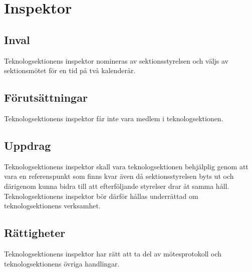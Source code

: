 \section{Inspektor}

\subsection{Inval}
Teknologsektionens inspektor nomineras av sektionsstyrelsen och väljs av sektionsmötet för en tid på två kalenderår.

\subsection{Förutsättningar}
Teknologsektionens inspektor får inte vara medlem i teknologsektionen.

\subsection{Uppdrag}
Teknologsektionens inspektor skall vara teknologsektionen behjälplig genom att vara en referenspunkt som finns kvar även då sektionsstyrelsen byts ut och därigenom kunna bidra till att efterföljande styrelser drar åt samma håll. Teknologsektionens inspektor bör därför hållas underrättad om teknologsektionens verksamhet.

\subsection{Rättigheter}
Teknologsektionens inspektor har rätt att ta del av mötesprotokoll och teknologsektionens övriga handlingar.